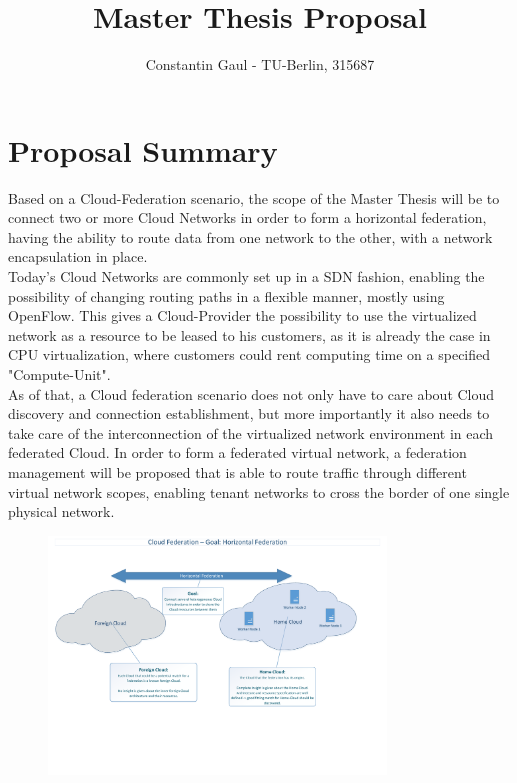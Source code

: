 \documentclass[a4paper,10pt]{article}
\title{Master Thesis Proposal}
\author{Constantin Gaul - TU-Berlin, 315687}
\begin{document}
\maketitle

\section{Proposal Summary}
Based on a Cloud-Federation scenario, the scope of the Master Thesis will be to connect two or more Cloud Networks in order to form a horizontal federation, having the ability to route data from one network to the other, with a network encapsulation in place.\\
Today's Cloud Networks are commonly set up in a SDN fashion, enabling the possibility of changing routing paths in a flexible manner, mostly using OpenFlow. This gives a Cloud-Provider the possibility to use the virtualized network as a resource to be leased to his customers, as it is already the case in CPU virtualization, where customers could rent computing time on a specified "Compute-Unit".\\
As of that, a Cloud federation scenario does not only have to care about Cloud discovery and connection establishment, but more importantly it also needs to take care of the interconnection of the virtualized network environment in each federated Cloud. In order to form a federated virtual network, a federation management will be proposed that is able to route traffic through different virtual network scopes, enabling tenant networks to cross the border of one single physical network.

\begin{figure}[h!]
 \centering
 \includegraphics[width=0.8\textwidth]{./gfx/federationProposal.pdf}
 \label{fig:federation_proposal}
\end{figure}
\end{document}
